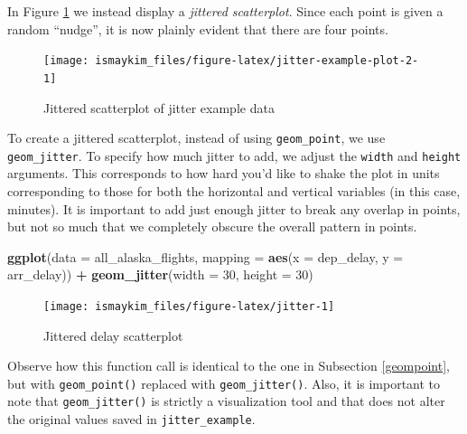 \documentclass[12pt,]{krantz}
\makeatletter
\newenvironment{Shaded}{\begin{snugshade}}{\end{snugshade}}
\newcommand{\KeywordTok}[1]{\textcolor[rgb]{0.27,0.27,0.27}{\textbf{#1}}}
\newcommand{\DataTypeTok}[1]{\textcolor[rgb]{0.27,0.27,0.27}{#1}}
\newcommand{\DecValTok}[1]{\textcolor[rgb]{0.06,0.06,0.06}{#1}}
\newcommand{\StringTok}[1]{\textcolor[rgb]{0.5,0.5,0.5}{#1}}
\newcommand{\OperatorTok}[1]{\textcolor[rgb]{0.43,0.43,0.43}{\textbf{#1}}}
\newcommand{\NormalTok}[1]{#1}
\newenvironment{kframe}{%
\medskip{}
\setlength{\fboxsep}{.8em}
 \def\at@end@of@kframe{}%
 \ifinner\ifhmode%
  \def\at@end@of@kframe{\end{minipage}}%
  \begin{minipage}{\columnwidth}%
 \fi\fi%
 \def\FrameCommand##1{\hskip\@totalleftmargin \hskip-\fboxsep
 \colorbox{shadecolor}{##1}\hskip-\fboxsep
     \hskip-\linewidth \hskip-\@totalleftmargin \hskip\columnwidth}%
 \MakeFramed {\advance\hsize-\width
   \@totalleftmargin\z@ \linewidth\hsize
   \@setminipage}}%
 {\par\unskip\endMakeFramed%
 \at@end@of@kframe}
\renewenvironment{Shaded}{\begin{kframe}}{\end{kframe}}
\theoremstyle{definition}
\theoremstyle{definition}
\theoremstyle{definition}
\theoremstyle{remark}
\makeatother
\begin{document}
In Figure \ref{fig:jitter-example-plot-2} we instead display a
\emph{jittered scatterplot}. Since each point is given a random
``nudge'', it is now plainly evident that there are four points.

\begin{figure}

{\centering \texttt{[image: ismaykim\_files/figure-latex/jitter-example-plot-2-1]} 

}

\caption{Jittered scatterplot of jitter example data}\label{fig:jitter-example-plot-2}
\end{figure}

To create a jittered scatterplot, instead of using \texttt{geom\_point},
we use \texttt{geom\_jitter}. To specify how much jitter to add, we
adjust the \texttt{width} and \texttt{height} arguments. This
corresponds to how hard you'd like to shake the plot in units
corresponding to those for both the horizontal and vertical variables
(in this case, minutes). It is important to add just enough jitter to
break any overlap in points, but not so much that we completely obscure
the overall pattern in points.

\begin{Shaded}
\begin{Highlighting}[]
\KeywordTok{ggplot}\NormalTok{(}\DataTypeTok{data =}\NormalTok{ all_alaska_flights, }
       \DataTypeTok{mapping =} \KeywordTok{aes}\NormalTok{(}\DataTypeTok{x =}\NormalTok{ dep_delay, }\DataTypeTok{y =}\NormalTok{ arr_delay)) }\OperatorTok{+}\StringTok{ }
\StringTok{  }\KeywordTok{geom_jitter}\NormalTok{(}\DataTypeTok{width =} \DecValTok{30}\NormalTok{, }\DataTypeTok{height =} \DecValTok{30}\NormalTok{)}
\end{Highlighting}
\end{Shaded}

\begin{figure}

{\centering \texttt{[image: ismaykim\_files/figure-latex/jitter-1]} 

}

\caption{Jittered delay scatterplot}\label{fig:jitter}
\end{figure}

Observe how this function call is identical to the one in Subsection
\ref{geompoint}, but with \texttt{geom\_point()} replaced with
\texttt{geom\_jitter()}. Also, it is important to note that
\texttt{geom\_jitter()} is strictly a visualization tool and that does
not alter the original values saved in \texttt{jitter\_example}.
\end{document}
